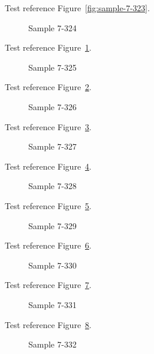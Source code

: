 Test reference Figure~\ref{fig:sample-7-323}.

\begin{figure}[tbhp]
\caption{Sample 7-324}
\label{fig:sample-7-324}
\end{figure}

Test reference Figure~\ref{fig:sample-7-324}.

\begin{figure}[tbhp]
\caption{Sample 7-325}
\label{fig:sample-7-325}
\end{figure}

Test reference Figure~\ref{fig:sample-7-325}.

\begin{figure}[tbhp]
\caption{Sample 7-326}
\label{fig:sample-7-326}
\end{figure}

Test reference Figure~\ref{fig:sample-7-326}.

\begin{figure}[tbhp]
\caption{Sample 7-327}
\label{fig:sample-7-327}
\end{figure}

Test reference Figure~\ref{fig:sample-7-327}.

\begin{figure}[tbhp]
\caption{Sample 7-328}
\label{fig:sample-7-328}
\end{figure}

Test reference Figure~\ref{fig:sample-7-328}.

\begin{figure}[tbhp]
\caption{Sample 7-329}
\label{fig:sample-7-329}
\end{figure}

Test reference Figure~\ref{fig:sample-7-329}.

\begin{figure}[tbhp]
\caption{Sample 7-330}
\label{fig:sample-7-330}
\end{figure}

Test reference Figure~\ref{fig:sample-7-330}.

\begin{figure}[tbhp]
\caption{Sample 7-331}
\label{fig:sample-7-331}
\end{figure}

Test reference Figure~\ref{fig:sample-7-331}.

\begin{figure}[tbhp]
\caption{Sample 7-332}
\label{fig:sample-7-332}
\end{figure}

